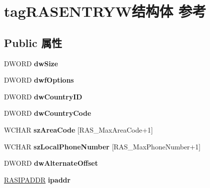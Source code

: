 \hypertarget{structtag_r_a_s_e_n_t_r_y_w}{}\section{tag\+R\+A\+S\+E\+N\+T\+R\+Y\+W结构体 参考}
\label{structtag_r_a_s_e_n_t_r_y_w}
\subsection*{Public 属性}
\begin{DoxyCompactItemize}
\item 
\mbox{\label{structtag_r_a_s_e_n_t_r_y_w_a0e1c4c1f8e9a1354e6047a1ea948b01e}} 
D\+W\+O\+RD {\bfseries dw\+Size}
\item 
\mbox{\label{structtag_r_a_s_e_n_t_r_y_w_adfca5593ea7665048520ce01b873d953}} 
D\+W\+O\+RD {\bfseries dwf\+Options}
\item 
\mbox{\label{structtag_r_a_s_e_n_t_r_y_w_a4de1b211645512daab2f090293debe19}} 
D\+W\+O\+RD {\bfseries dw\+Country\+ID}
\item 
\mbox{\label{structtag_r_a_s_e_n_t_r_y_w_a8988f7c4293d4d45a472b5b964989853}} 
D\+W\+O\+RD {\bfseries dw\+Country\+Code}
\item 
\mbox{\label{structtag_r_a_s_e_n_t_r_y_w_ad28d813e4f660a397a7a69a125d6786b}} 
W\+C\+H\+AR {\bfseries sz\+Area\+Code} \mbox{[}R\+A\+S\+\_\+\+Max\+Area\+Code+1\mbox{]}
\item 
\mbox{\label{structtag_r_a_s_e_n_t_r_y_w_afde3a6758582ec80589781a4473a4a17}} 
W\+C\+H\+AR {\bfseries sz\+Local\+Phone\+Number} \mbox{[}R\+A\+S\+\_\+\+Max\+Phone\+Number+1\mbox{]}
\item 
\mbox{\label{structtag_r_a_s_e_n_t_r_y_w_ad4184301f0395d04f2eac32b66740a4f}} 
D\+W\+O\+RD {\bfseries dw\+Alternate\+Offset}
\item 
\mbox{\label{structtag_r_a_s_e_n_t_r_y_w_ad29bceb4db7f62d3f0b898a75932c989}} 
\hyperlink{structtag_r_a_s_i_p_a_d_d_r}{R\+A\+S\+I\+P\+A\+D\+DR} {\bfseries ipaddr}

\end{DoxyCompactItemize}
